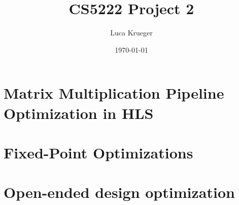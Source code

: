 \documentclass{article}
\title{CS5222 Project 2}
\author{Luca Krueger}
\date{\today}
\begin{document}
\maketitle

\section{Matrix Multiplication Pipeline Optimization in HLS}


\newpage
\section{Fixed-Point Optimizations}


\newpage
\section{Open-ended design optimization}

\end{document}

